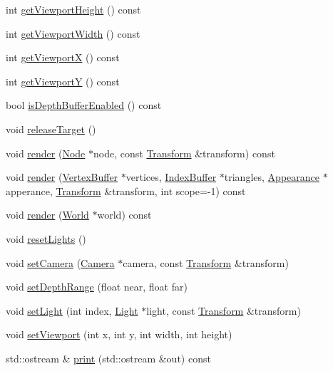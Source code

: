 \begin{CompactItemize}
\item 
int \hyperlink{classm3g_1_1Graphics3D_d51e0c421126f5deb61b359cdb7dab2e}{getViewportHeight} () const 
\item 
int \hyperlink{classm3g_1_1Graphics3D_768e5c057e2fa4c4b17a67134abbf89f}{getViewportWidth} () const 
\item 
int \hyperlink{classm3g_1_1Graphics3D_af58b44cc6219f86c40dadb8a9377856}{getViewportX} () const 
\item 
int \hyperlink{classm3g_1_1Graphics3D_c21665afbf94a8f0153e099833c2b61a}{getViewportY} () const 
\item 
bool \hyperlink{classm3g_1_1Graphics3D_7f17c6781152840d42e756c27b0fb8c8}{isDepthBufferEnabled} () const 
\item 
void \hyperlink{classm3g_1_1Graphics3D_1491a435e97a20d5325339359a719cc5}{releaseTarget} ()
\item 
void \hyperlink{classm3g_1_1Graphics3D_8f7b52c44e84e6ccbbb639d1b5b80466}{render} (\hyperlink{classm3g_1_1Node}{Node} $\ast$node, const \hyperlink{classm3g_1_1Transform}{Transform} \&transform) const 
\item 
void \hyperlink{classm3g_1_1Graphics3D_c809eea19f3eaff279628081fc90cf36}{render} (\hyperlink{classm3g_1_1VertexBuffer}{VertexBuffer} $\ast$vertices, \hyperlink{classm3g_1_1IndexBuffer}{IndexBuffer} $\ast$triangles, \hyperlink{classm3g_1_1Appearance}{Appearance} $\ast$apperance, \hyperlink{classm3g_1_1Transform}{Transform} \&transform, int scope=-1) const 
\item 
void \hyperlink{classm3g_1_1Graphics3D_8ef004c92d601203b8c697d441e7713f}{render} (\hyperlink{classm3g_1_1World}{World} $\ast$world) const 
\item 
void \hyperlink{classm3g_1_1Graphics3D_b8821ec231e8ebd939ae0feaaf138542}{resetLights} ()
\item 
void \hyperlink{classm3g_1_1Graphics3D_0df7bb61cfeba6626e20fd07ddd1c460}{setCamera} (\hyperlink{classm3g_1_1Camera}{Camera} $\ast$camera, const \hyperlink{classm3g_1_1Transform}{Transform} \&transform)
\item 
void \hyperlink{classm3g_1_1Graphics3D_6fc3837286f3516aa3320aeec9729495}{setDepthRange} (float near, float far)
\item 
void \hyperlink{classm3g_1_1Graphics3D_2bf83cb69f50117dd9d5548fe96d0ab0}{setLight} (int index, \hyperlink{classm3g_1_1Light}{Light} $\ast$light, const \hyperlink{classm3g_1_1Transform}{Transform} \&transform)
\item 
void \hyperlink{classm3g_1_1Graphics3D_0b4ec48e9c19060e9be5648c118c23b1}{setViewport} (int x, int y, int width, int height)
\item 
std::ostream \& \hyperlink{classm3g_1_1Graphics3D_6fea17fa1532df3794f8cb39cb4f911f}{print} (std::ostream \&out) const 
\end{CompactItemize}
